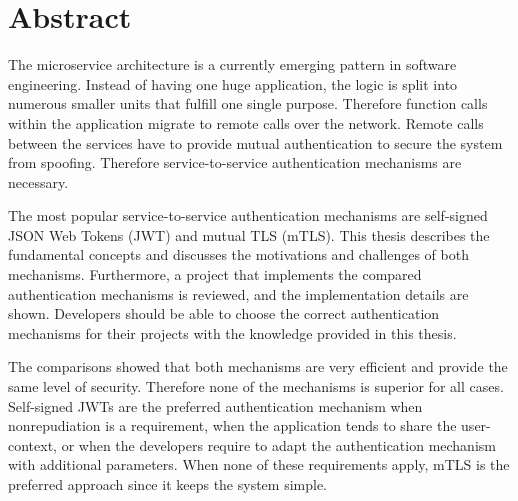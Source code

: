 \chapter{Abstract}
The microservice architecture is a currently emerging pattern in software engineering.
Instead of having one huge application, the logic is split into numerous smaller units that fulfill one single purpose.
Therefore function calls within the application migrate to remote calls over the network.
Remote calls between the services have to provide mutual authentication to secure the system from spoofing.
Therefore service-to-service authentication mechanisms are necessary. 

The most popular service-to-service authentication mechanisms are self-signed JSON Web Tokens (JWT) and mutual TLS (mTLS).
This thesis describes the fundamental concepts and discusses the motivations and challenges of both mechanisms.
Furthermore, a project that implements the compared authentication mechanisms is reviewed, and the implementation details are shown.
Developers should be able to choose the correct authentication mechanisms for their projects with the knowledge provided in this thesis.

The comparisons showed that both mechanisms are very efficient and provide the same level of security.
Therefore none of the mechanisms is superior for all cases.
Self-signed JWTs are the preferred authentication mechanism when nonrepudiation is a requirement, when the application tends to share the user-context, or when the developers require to adapt the authentication mechanism with additional parameters.
When none of these requirements apply, mTLS is the preferred approach since it keeps the system simple.

